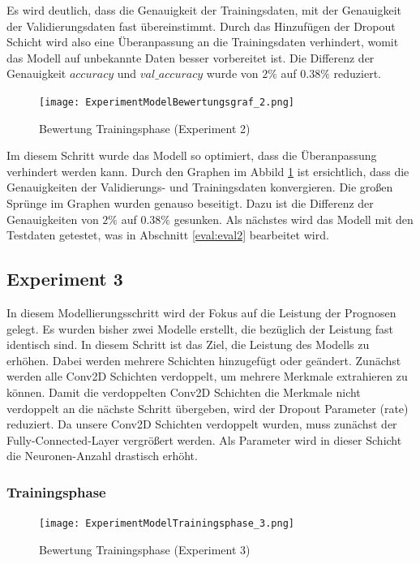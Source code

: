\documentclass[12pt]{scrreprt}
\begin{document}
Es wird deutlich, dass die Genauigkeit der Trainingsdaten, mit der Genauigkeit der Validierungsdaten fast übereinstimmt. Durch das Hinzufügen der Dropout Schicht wird also eine Überanpassung an die Trainingsdaten verhindert, womit das Modell auf unbekannte Daten besser vorbereitet ist. Die Differenz der Genauigkeit $accuracy$ und $val\_accuracy$ wurde von $2\%$ auf  $0.38\%$ reduziert.

\begin{figure}[h!]
	\centering
	\texttt{[image: ExperimentModelBewertungsgraf\_2.png]}
	\caption{ Bewertung Trainingsphase \cite{HK22}(Experiment 2)}
	\label{fig:fig28}
\end{figure}

Im diesem Schritt wurde das Modell so optimiert, dass die Überanpassung verhindert werden kann. Durch den Graphen im Abbild \ref{fig:fig28} ist ersichtlich, dass die Genauigkeiten der Validierungs- und Trainingsdaten konvergieren. Die großen Sprünge im Graphen wurden genauso beseitigt. Dazu ist die Differenz der Genauigkeiten von $2\%$ auf $0.38\%$ gesunken. Als nächstes wird das Modell mit den Testdaten getestet, was in Abschnitt \ref{eval:eval2} bearbeitet wird.

\subsection{Experiment 3}\label{model:ep3}

In diesem Modellierungsschritt wird der Fokus auf die Leistung der Prognosen gelegt. Es wurden bisher zwei Modelle erstellt, die bezüglich der Leistung  fast identisch sind. In diesem Schritt ist das Ziel, die Leistung des Modells zu erhöhen. Dabei werden mehrere Schichten hinzugefügt oder geändert. Zunächst werden alle Conv2D Schichten verdoppelt, um mehrere Merkmale extrahieren zu können. Damit die verdoppelten Conv2D Schichten die Merkmale nicht verdoppelt an die nächste Schritt übergeben, wird der Dropout Parameter (rate) reduziert. Da unsere Conv2D Schichten verdoppelt wurden, muss zunächst der Fully-Connected-Layer vergrößert werden. Als Parameter wird in dieser Schicht die Neuronen-Anzahl drastisch erhöht.

\subsubsection{Trainingsphase}


\begin{figure}[h!]
	\centering
	\texttt{[image: ExperimentModelTrainingsphase\_3.png]}
	\caption{ Bewertung Trainingsphase \cite{HK22}(Experiment 3)}
	\label{fig:fig31}
\end{figure}
\end{document}
